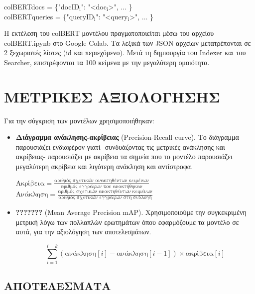 ﻿\documentclass[12pt]{report}
\begin{document}
            \begin{graycomment}
                \fontCode\footnotesize colBERTdocs = \{"docID\(_\text{i}\)": "<doc\(_\text{i}\)>", \(\ldots\) \} \\
                \fontCode\footnotesize colBERTqueries = \{"queryID\(_\text{i}\)": "<query\(_\text{i}\)>", \(\ldots\) \}
            \end{graycomment}

            Η εκτέλεση του colBERT μοντέλου πραγματοποιείται μέσω του αρχείου {\fontCode\small colBERT.ipynb} στο Google Colab.
            Τα λεξικά των JSON αρχείων μετατρέπονται σε 2 ξεχωριστές λίστες (id και περιεχόμενο). Μετά τη δημιουργία του Indexer και του Searcher,
            επιστρέφονται τα 100 κείμενα με την μεγαλύτερη ομοιότητα.

        \chapter{ΜΕΤΡΙΚΕΣ ΑΞΙΟΛΟΓΗΣΗΣ}
            Για την σύγκριση των μοντέλων χρησιμοποιήθηκαν:
            \begin{itemize}
                \item \textbf{Διάγραμμα ανάκλησης-ακρίβειας} {\fontTimes(Precision-Recall curve)}. Το διάγραμμα παρουσιάζει ενδιαφέρον γιατί -συνδυάζοντας τις μετρικές ανάκλησης και ακρίβειας-
            παρουσιάζει με ακρίβεια τα σημεία που το μοντέλο παρουσιάζει μεγαλύτερη ακρίβεια και λιγότερη ανάκληση και αντίστροφα.

                \begin{multicols}{2} \centering
                    \( \text{Ακρίβεια} = \frac{\text{αριθμός σχετικών ανακτηθέντων κειμένων}}{\text{αριθμός εγγράφων που ανακτήθηκαν}} \) \\
                    \( \text{Ανάκληση} = \frac{\text{αριθμός σχετικών ανακτηθέντων κειμένων}}{\text{αριθμός σχετικών εγγράφων στη συλλογή}} \)
                \end{multicols}

                \item \textbf{???????} {\fontTimes (Mean Average Precision \textendash\hspace{1pt} mAP)}. Χρησιμοποιούμε την συγκεκριμένη μετρική λόγω των πολλαπλών ερωτημάτων όπου εφαρμόζουμε τα μοντέλο σε αυτά, για την αξιολόγηση των αποτελεσμάτων.

                    \begin{displaymath}
                        \sum_{i=1}^{i=k}(\text{ανάκληση}[i] - \text{ανάκληση}[i-1])\times\text{ακρίβεια}[i]
                    \end{displaymath}
            \end{itemize}

            \section{\hspace{1pt}ΑΠΟΤΕΛΕΣΜΑΤΑ\hspace{1pt}}
\end{document}
